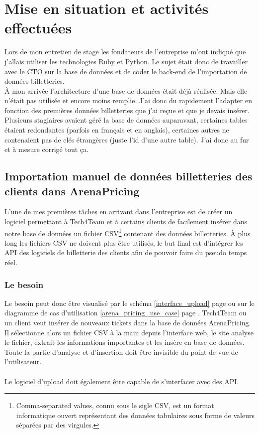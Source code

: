 \chapter{Mise en situation et activités effectuées}

Lors de mon entretien de stage les fondateurs de l'entreprise m'ont indiqué que j'allais utiliser les technologies Ruby et Python. Le sujet était donc de travailler avec le CTO sur la base de données et de coder le back-end de l'importation de données billetteries.
\\ 

À mon arrivée l'architecture d'une base de données était déjà réalisée. Mais elle n'était pas utilisée et encore moins remplie. J'ai donc du rapidement l'adapter en fonction des premières données billetteries que j'ai reçue et que je devais insérer. Plusieurs stagiaires avaient géré la base de données auparavant, certaines tables étaient redondantes (parfois en français et en anglais), certaines autres ne contenaient pas de clés étrangères (juste l'id d'une autre table). J'ai donc au fur et à mesure corrigé tout ça.


\section{Importation manuel de données billetteries des clients dans ArenaPricing}

L'une de mes premières tâches en arrivant dans l'entreprise est de créer un logiciel permettant à Tech4Team et à certains clients de facilement insérer dans notre base de données un fichier CSV\footnote{Comma-separated values, connu sous le sigle CSV, est un format informatique ouvert représentant des données tabulaires sous forme de valeurs séparées par des virgules.} contenant des données billetteries. À plus long les fichiers CSV ne doivent plus être utilisés, le but final est d'intégrer les API des logiciels de billetterie des clients afin de pouvoir faire du pseudo temps réel.

\subsection{Le besoin}

Le besoin peut donc être visualisé par le schéma \ref{interface_upload} page \pageref{interface_upload} ou sur le diagramme de cas d'utilisation \ref{arena_pricing_use_case} page \pageref{arena_pricing_use_case}. Tech4Team ou un client veut insérer de nouveaux tickets dans la base de données ArenaPricing. Il sélectionne alors un fichier CSV à la main depuis l'interface web, le site analyse le fichier, extrait les informations importantes et les insère en base de données. Toute la partie d'analyse et d'insertion doit être invisible du point de vue de l'utilisateur.
\\ \\
Le logiciel d'upload doit également être capable de s'interfacer avec des API.

